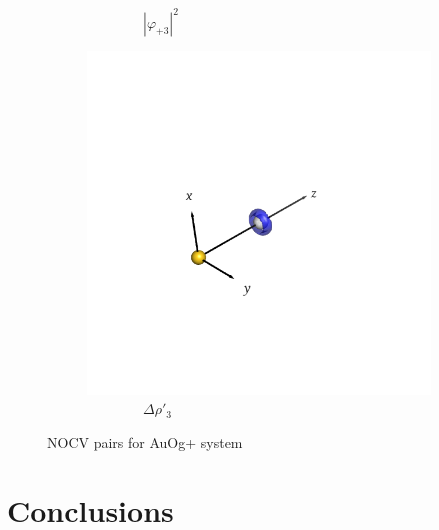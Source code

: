 \documentclass[journal=inoraj,manuscript=article]{achemso}
\begin{document}
\begin{figure}[!h]
\begin{subfigure}[t]{0.32\textwidth}
        \caption*{\ \ \ \ \ \ \ \ $|\varphi_{+3}|^2$} 
    \end{subfigure}
    \hfill
    \begin{subfigure}[t]{0.32\textwidth}
        \centering
        \includegraphics[width=\linewidth]{./AuOg+/pair5.png} 
        \caption*{\ \ \ \ \ \ \ \ $\Delta \rho'_3$} 
    \end{subfigure}

\caption{NOCV pairs for AuOg+ system}
\end{figure}



\section{Conclusions}
\end{document}
